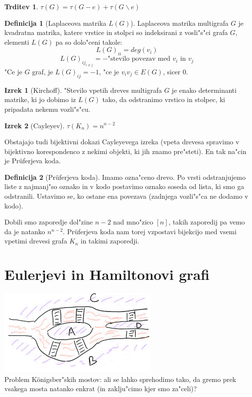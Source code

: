 \documentclass{article}
\theoremstyle{definition}
\newtheorem{definition}{Definicija}[section]
\newtheorem{claim}{Trditev}[section]
\newtheorem{theorem}{Izrek}[section]
\begin{document}
	\begin{claim}
		$\tau(G) = \tau(G-e) + \tau(G \backslash e)$
	\end{claim}
	
	\begin{definition}[Laplaceova matrika $L(G)$]
		Laplaceova matrika multigrafa $G$ je kvadratna matrika, katere vrstice in stolpci so indeksirani z vosli"s"ci grafa $G$, elementi $L(G)$ pa so dolo"ceni takole:
		$$ L(G)_{ii} = deg(v_i)$$
		$$ L(G)_{ij_{i \neq j}} = -\text{"stevilo povezav med }v_i\text{ in }v_j $$
		"Ce je $G$ graf, je $L(G)_{ij} = -1$, "ce je $v_iv_j \in E(G)$, sicer 0.
	\end{definition}

	\begin{theorem}[Kirchoff]
		"Stevilo vpetih dreves multigrafa $G$ je enako determinanti matrike, ki jo dobimo iz $L(G)$  tako, da odstranimo vrstico in stolpec, ki pripadata nekemu vozli"s"cu.
	\end{theorem} 

	\begin{theorem}[Cayleyev]
		$\tau(K_n) = n^{n-2}$
	\end{theorem}
	
	Obstajajo tudi bijektivni dokazi Cayleyevega izreka (vpeta drevesa spravimo v bijektivno korespondenco z nekimi objekti, ki jih znamo pre"steti). En tak na"cin je Pr\"uferjeva koda.
	\begin{definition}[Pr\"uferjeva koda]
		Imamo ozna"ceno drevo. Po vrsti odstranjujemo liste z najmanj"so oznako in v kodo postavimo oznako soseda od lista, ki smo ga odstranili. Ustavimo se, ko ostane ena povezava (zadnjega vozli"s"ca ne dodamo v kodo).
	\end{definition}
	Dobili smo zaporedje dol"zine $n-2$ nad mno"zico $[n]$, takih zaporedij pa vemo da je natanko $n^{n-2}$. Pr\"uferjeva koda nam torej vzpostavi bijekcijo med vsemi vpetimi drevesi grafa $K_n$ in takimi zaporedji.
	
	\section{Eulerjevi in Hamiltonovi grafi}
	\includegraphics{reka-pregel} \\
	Problem K\"onigsber"skih mostov: ali se lahko sprehodimo tako, da gremo prek vsakega mosta natanko enkrat (in zaklju"cimo kjer smo za"celi)?
	
\end{document}
